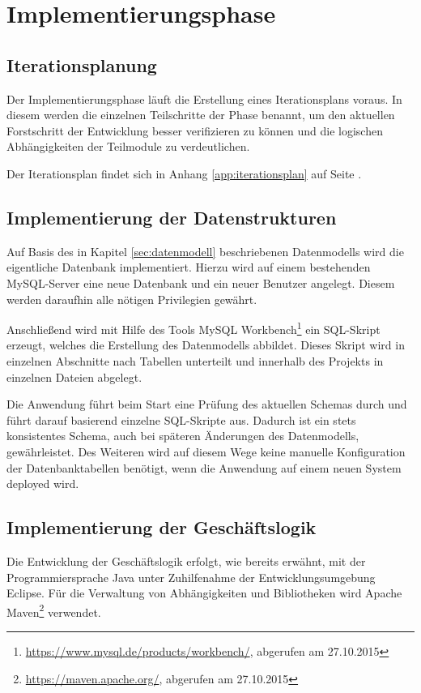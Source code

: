 \documentclass[12pt, xcolor=dvipsnames]{scrartcl}
\begin{document}
\section{Implementierungsphase}

\subsection{Iterationsplanung}

Der Implementierungsphase läuft die Erstellung eines Iterationsplans voraus. In diesem werden die einzelnen Teilschritte der Phase benannt, um den aktuellen Forstschritt der Entwicklung besser verifizieren zu können und die logischen Abhängigkeiten der Teilmodule zu verdeutlichen.

Der Iterationsplan findet sich in Anhang \ref{app:iterationsplan} auf Seite \pageref{app:iterationsplan}.

\subsection{Implementierung der Datenstrukturen}

Auf Basis des in Kapitel \ref{sec:datenmodell} beschriebenen Datenmodells wird die eigentliche Datenbank implementiert. Hierzu wird auf einem bestehenden MySQL-Server eine neue Datenbank und ein neuer Benutzer angelegt. Diesem werden daraufhin alle nötigen Privilegien gewährt.

Anschließend wird mit Hilfe des Tools
MySQL Workbench\footnote{\url{https://www.mysql.de/products/workbench/}, abgerufen am 27.10.2015} ein SQL-Skript erzeugt, welches die Erstellung des Datenmodells abbildet. Dieses Skript wird in einzelnen Abschnitte nach Tabellen unterteilt und innerhalb des Projekts in einzelnen Dateien abgelegt.


Die Anwendung führt beim Start eine Prüfung des aktuellen Schemas durch und führt darauf basierend einzelne SQL-Skripte aus. Dadurch ist ein stets konsistentes Schema, auch bei späteren Änderungen des Datenmodells, gewährleistet. Des Weiteren wird auf diesem Wege keine manuelle Konfiguration der Datenbanktabellen benötigt, wenn die Anwendung auf einem neuen System deployed wird.

\subsection{Implementierung der Geschäftslogik}

Die Entwicklung der Geschäftslogik erfolgt, wie bereits erwähnt, mit der Programmiersprache Java unter Zuhilfenahme der Entwicklungsumgebung Eclipse. Für die Verwaltung von Abhängigkeiten und Bibliotheken wird
Apache Maven\footnote{\url{https://maven.apache.org/}, abgerufen am 27.10.2015}
verwendet.
\end{document}
